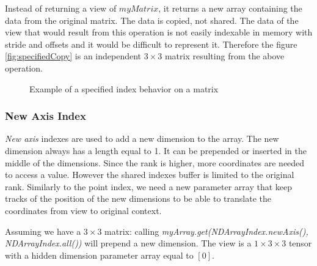 Instead of returning a view of $myMatrix$, it returns a new array containing the data from the original matrix. The data is copied, not shared. The data of the view that would result from this operation is not easily indexable in memory with stride and offsets and it would be difficult to represent it. Therefore the figure \ref{fig:specifiedCopy} is an independent $3\times 3$ matrix resulting from the above operation.

\begin{figure}[!h]
	\centering
	\qquad
	\hfill
	\caption{Example of a specified index behavior on a matrix}
\end{figure}


\subsubsection{New Axis Index}
\textit{New axis} indexes are used to add a new dimension to the array. The new dimension always has a length equal to 1. It can be prepended or inserted in the middle of the dimensions.
Since the rank is higher, more coordinates are needed to access a value. However the shared indexes buffer is limited to the original rank. Similarly to the point index, we need a new parameter array that keep tracks of the position of the new dimensions to be able to translate the coordinates from view to original context.

Assuming we have a $3\times 3$ matrix: calling \textit{myArray.get(NDArrayIndex.newAxis(), NDArrayIndex.all())} will prepend a new dimension. The view is a $1\times 3\times 3$ tensor with a hidden dimension parameter array equal to $[0]$.

